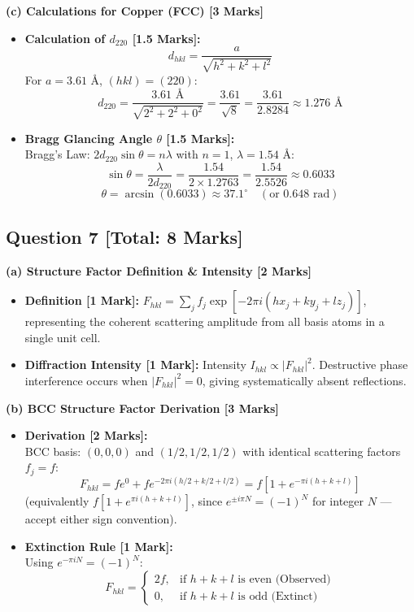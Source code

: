 \documentclass[10pt,a4paper,twocolumn]{article}
\begin{document}
\textbf{(c) Calculations for Copper (FCC) [3 Marks]}
\begin{itemize}
    \item \textbf{Calculation of $d_{220}$ [1.5 Marks]:}
    $$d_{hkl} = \frac{a}{\sqrt{h^2 + k^2 + l^2}}$$
    For $a = 3.61\text{ \AA}$, $(hkl) = (220)$:
    $$d_{220} = \frac{3.61\text{ \AA}}{\sqrt{2^2 + 2^2 + 0^2}} = \frac{3.61}{\sqrt{8}} = \frac{3.61}{2.8284} \approx 1.276\text{ \AA}$$
    \item \textbf{Bragg Glancing Angle $\theta$ [1.5 Marks]:}\\
    Bragg's Law: $2 d_{220} \sin\theta = n\lambda$ with $n=1$, $\lambda = 1.54\text{ \AA}$:
    $$\sin\theta = \frac{\lambda}{2 d_{220}} = \frac{1.54}{2 \times 1.2763} = \frac{1.54}{2.5526} \approx 0.6033$$
    $$\theta = \arcsin(0.6033) \approx 37.1^\circ \quad (\text{or } 0.648\text{ rad})$$
\end{itemize}

\subsection*{Question 7 [Total: 8 Marks]}
\textbf{(a) Structure Factor Definition \& Intensity [2 Marks]}
\begin{itemize}
    \item \textbf{Definition [1 Mark]:} $F_{hkl} = \sum_{j} f_j \exp[-2\pi i (h x_j + k y_j + l z_j)]$, representing the coherent scattering amplitude from all basis atoms in a single unit cell.
    \item \textbf{Diffraction Intensity [1 Mark]:} Intensity $I_{hkl} \propto |F_{hkl}|^2$. Destructive phase interference occurs when $|F_{hkl}|^2 = 0$, giving systematically absent reflections.
\end{itemize}

\textbf{(b) BCC Structure Factor Derivation [3 Marks]}
\begin{itemize}
    \item \textbf{Derivation [2 Marks]:}\\
    BCC basis: $(0,0,0)$ and $(1/2, 1/2, 1/2)$ with identical scattering factors $f_j = f$:
    $$F_{hkl} = f e^{0} + f e^{-2\pi i(h/2 + k/2 + l/2)} = f \left[1 + e^{-\pi i(h+k+l)}\right]$$
    (equivalently $f[1+e^{\pi i(h+k+l)}]$, since $e^{\pm i\pi N}=(-1)^N$ for integer $N$ — accept either sign convention).
    \item \textbf{Extinction Rule [1 Mark]:}\\
    Using $e^{-\pi i N} = (-1)^N$:
    $$F_{hkl} = \begin{cases} 2f, & \text{if } h+k+l \text{ is even (Observed)} \\ 0, & \text{if } h+k+l \text{ is odd (Extinct)} \end{cases}$$
\end{itemize}
\end{document}
